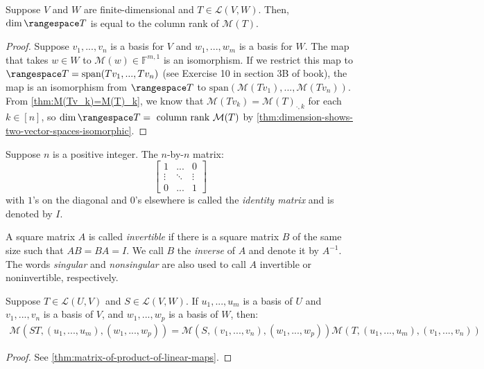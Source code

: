 \documentclass{article}
\begin{document}
\begin{theorem}
  \label{thm:dim-range-T-equals-column-rank-M(T)}
  Suppose $V$ and $W$ are finite-dimensional and $T \in \mathcal{L}(V,
  W)$. Then, $\dim \rangespace T$ is equal to the column rank of $\mathcal{M}(T)$.
\end{theorem}
\begin{proof}
  Suppose $v_1, ..., v_n$ is a basis for $V$ and $w_1, ..., w_m$ is a
  basis for $W$. The map that takes $w \in W$ to $\mathcal{M}(w) \in
  \mathbb{F}^{m, 1}$ is an isomorphism. If we restrict this map to
  $\rangespace T = \text{span}(Tv_1, ..., Tv_n)$ (see Exercise 10 in
  section 3B of book), the map is an isomorphism from $\rangespace T$
  to $\text{span}(\mathcal{M}(Tv_1), ..., \mathcal{M}(Tv_n))$. From
  \cref{thm:M(Tv_k)=M(T)_k}, we know that $\mathcal{M}(Tv_k) =
  \mathcal{M}(T)_{\cdot, k}$ for each $k \in [n]$, so $\dim
  \rangespace T = \text{ column rank } \mathcal{M}(T)$ by \cref{thm:dimension-shows-two-vector-spaces-isomorphic}.
\end{proof}

\begin{definition}
  \label{def:identity-matrix}
  Suppose $n$ is a positive integer. The $n$-by-$n$ matrix:
  \[
    \begin{bmatrix}
      1 & ... & 0 \\
      \vdots & \ddots & \vdots \\
      0 & ... & 1
    \end{bmatrix}
  \]
  with $1$'s on the diagonal and $0$'s elsewhere is called the
  \textit{identity matrix} and is denoted by $I$.
\end{definition}

\begin{definition}
  \label{def:invertible-matrix}
  A square matrix $A$ is called \textit{invertible} if there is a
  square matrix $B$ of the same size such that $AB = BA = I$. We call
  $B$ the \textit{inverse} of $A$ and denote it by $A^{-1}$. The words
  \textit{singular} and \textit{nonsingular} are also used to call $A$
  invertible or noninvertible, respectively.
\end{definition}

\begin{theorem}
  \label{thm:matrix-of-product-of-linear-maps-with-basis}
  Suppose $T \in \mathcal{L}(U, V)$ and $S \in \mathcal{L}(V, W)$. If
  $u_1, ..., u_m$ is a basis of $U$ and $v_1, ..., v_n$ is a basis of
  $V$, and $w_1, ..., w_p$ is a basis of $W$, then:
  \begin{align*}
    \mathcal{M}(ST, (u_1, ..., u_m), (w_1, ..., w_p)) = \mathcal{M}(S,
    (v_1, ..., v_n), (w_1, ..., w_p)) \mathcal{M}(T, (u_1, ..., u_m),
    (v_1, ..., v_n))
  \end{align*}
\end{theorem}
\begin{proof}
  See \cref{thm:matrix-of-product-of-linear-maps}.
\end{proof}
\end{document}
